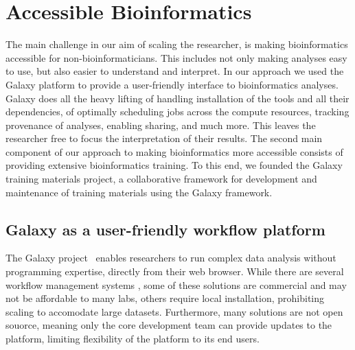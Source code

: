 

\section{Accessible Bioinformatics}

The main challenge in our aim of scaling the researcher, is making bioinformatics accessible for non-bioinformaticians. This includes not only making analyses easy to use, but also easier to understand and interpret.
In our approach we used the Galaxy platform to provide a user-friendly interface to bioinformatics analyses. Galaxy does all the heavy lifting of handling installation of the tools and all their dependencies, of optimally scheduling jobs across the compute resources, tracking provenance of analyses, enabling sharing, and much more. This leaves the researcher free to focus the interpretation of their results.
The second main component of our approach to making bioinformatics more accessible consists of providing extensive bioinformatics training. To this end, we founded the Galaxy training materials project, a collaborative framework for development and maintenance of training materials using the Galaxy framework.


\subsection{Galaxy as a user-friendly workflow platform}

The Galaxy project~\cite{giardine2005galaxy,blankenberg2010galaxy,afgan2016galaxy} enables researchers to run complex data analysis without programming expertise, directly from their web browser. While there are several workflow management systems \cite{clcbio,taverna,onlinehpc,anduril,molgenis}, some of these solutions are commercial and may not be affordable to many labs, others require local installation, prohibiting scaling to accomodate large datasets. Furthermore, many solutions are not open souorce, meaning only the core development team can provide updates to the platform, limiting flexibility of the platform to its end users.

